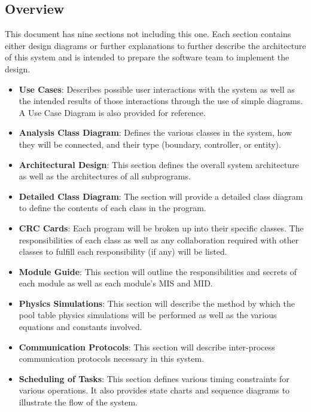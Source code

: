 \documentclass[titlepage]{article}
\begin{document}
\subsection{Overview}
This document has nine sections not including this one. Each section contains either design diagrams or further explanations to further describe the architecture of this system and is intended to prepare the software team to implement the design.\\
\begin{itemize}
	\item \textbf{Use Cases}: Describes possible user interactions with the system as well as the intended results of those interactions through the use of simple diagrams. A Use Case Diagram is also provided for reference.\\
	\item \textbf{Analysis Class Diagram}: Defines the various classes in the system, how they will be connected, and their type (boundary, controller, or entity).\\
	\item \textbf{Architectural Design}: This section defines the overall system architecture as well as the architectures of all subprograms.\\
	\item \textbf{Detailed Class Diagram}: The section will provide a detailed class diagram to define the contents of each class in the program.\\
	\item \textbf{CRC Cards}: Each program will be broken up into their specific classes. The responsibilities of each class as well as any collaboration required with other classes to fulfill each responsibility (if any) will be listed.\\
	\item \textbf{Module Guide}: This section will outline the responsibilities and secrets of each module as well as each module's MIS and MID.\\
	\item \textbf{Physics Simulations}: This section will describe the method by which the pool table physics simulations will be performed as well as the various equations and constants involved.\\
	\item \textbf{Communication Protocols}: This section will describe inter-process communication protocols necessary in this system.\\
	\item \textbf{Scheduling of Tasks}: This section defines various timing constraints for various operations. It also provides state charts and sequence diagrams to illustrate the flow of the system.\\
\end{itemize}
\newpage
\end{document}
